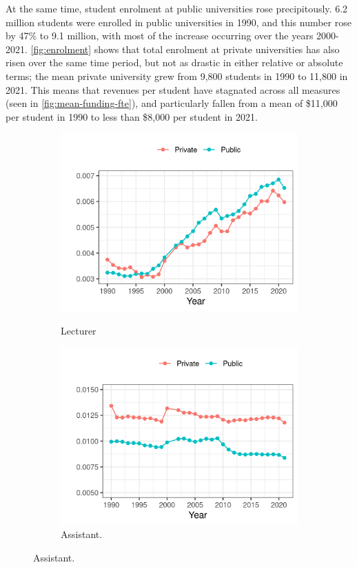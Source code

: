 \documentclass[notitlepage,12pt]{article}
\begin{document}
At the same time, student enrolment at public universities rose precipitously.
6.2 million students were enrolled in public universities in 1990, and this number rose by 47\% to 9.1 million, with most of the increase occurring over the years 2000-2021.
\autoref{fig:enrolment} shows that total enrolment at private universities has also risen over the same time period, but not as drastic in either relative or absolute terms; the mean private university grew from 9,800 students in 1990 to 11,800 in 2021.
This means that revenues per student have stagnated across all measures (seen in \autoref{fig:mean-funding-fte}), and particularly fallen from a mean of \$11,000 per student in 1990 to less than \$8,000 per student in 2021.

\begin{figure}[h!]
    \centering
    \singlespacing
    \caption{Total Professor Count per Student, by University Sector, Professor Appointment, and Year.}
    \begin{subfigure}[b]{0.495\textwidth}
        \centering
        \caption{Lecturer}
        \includegraphics[width=\textwidth]{figures/lecturer-fte-perprof.png}
        \label{fig:lecturer-fte-perprof}
    \end{subfigure}
    \begin{subfigure}[b]{0.495\textwidth}
        \centering
        \caption{Assistant.}
        \includegraphics[width=\textwidth]{figures/assistant-fte-perprof.png}

\end{subfigure}
\end{figure}
\end{document}

